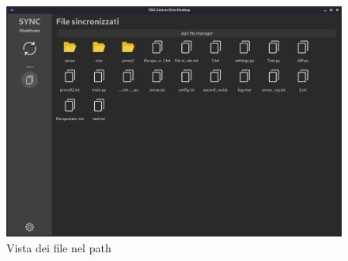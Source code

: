 \begin{figure}[H]
    \centering
    \includegraphics[scale = 0.30]{components/img/file-view.png}
    \caption{Vista dei file nel path}
    \label{fig:Vista dei file nel path}
\end{figure}